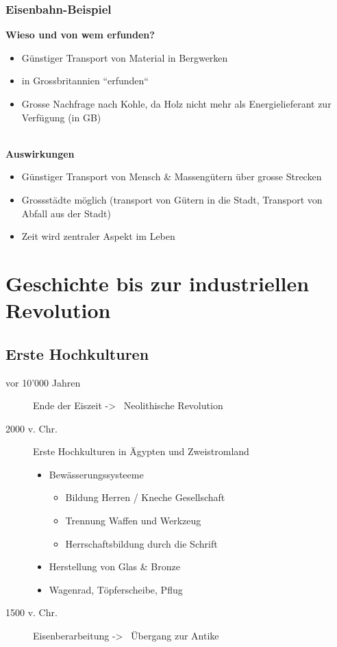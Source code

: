 \documentclass{report}
\begin{document}
\subsection{Eisenbahn-Beispiel}
\textbf{Wieso und von wem erfunden?}
\begin{itemize}
	\item Günstiger Transport von Material in Bergwerken
	\item in Grossbritannien ``erfunden``
	\item Grosse Nachfrage nach Kohle, da Holz nicht mehr als Energielieferant zur Verfügung (in GB)
\end{itemize}~\\
\textbf{Auswirkungen}
\begin{itemize}
	\item Günstiger Transport von Mensch \& Massengütern über grosse Strecken
	\item Grossstädte möglich (transport von Gütern in die Stadt, Transport von Abfall aus der Stadt)
	\item Zeit wird zentraler Aspekt im Leben
\end{itemize}

\newpage

\chapter{Geschichte bis zur industriellen Revolution}
\section{Erste Hochkulturen}
\begin{description}
	\item[vor 10'000 Jahren] Ende der Eiszeit -\textgreater~ Neolithische Revolution
	\item[2000 v. Chr.] Erste Hochkulturen in Ägypten und Zweistromland
		\begin{itemize}
			\item Bewässerungssysteeme
				\begin{itemize}
					\item Bildung Herren / Kneche Gesellschaft
					\item Trennung Waffen und Werkzeug
					\item Herrschaftsbildung durch die Schrift
				\end{itemize}
			\item Herstellung von Glas \& Bronze
			\item Wagenrad, Töpferscheibe, Pflug
		\end{itemize}
	\item[1500 v. Chr.] Eisenberarbeitung -\textgreater~ Übergang zur Antike
\end{description}
\end{document}
